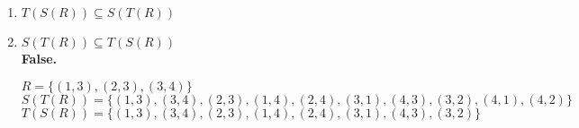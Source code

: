 \documentclass[11pt]{article}
\begin{document}
	\begin{enumerate}
		\item $T(S(R)) \subseteq S(T(R))$ \\
		

		\item $S(T(R)) \subseteq T(S(R))$ \\
		\textbf{False.}

		$R = \{(1 , 3) , (2 , 3) , (3 , 4)\}$ \\

		$S(T(R)) = \{(1 , 3) , (3 , 4) , (2 , 3) , (1 , 4) , (2 , 4) , (3 , 1) , (4 , 3) , (3 , 2) , (4 , 1) , (4 , 2)\}$ \\

		$T(S(R)) = \{(1 , 3) , (3 , 4) , (2 , 3) , (1 , 4) , (2 , 4) , (3 , 1) , (4 , 3) , (3 , 2)\}$
	\end{enumerate}

	
\end{document}
